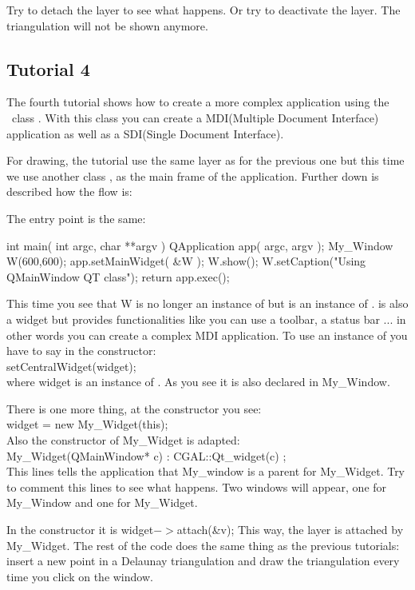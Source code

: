 Try to detach the layer to see what happens. Or try to deactivate
the layer. The triangulation will not be shown anymore.

\subsection*{Tutorial 4}

The fourth tutorial shows how to create a more complex application
using the \qt\ class . With this class you can create a
MDI(Multiple Document Interface) application as well as a SDI(Single Document Interface).

For drawing, the tutorial use the same layer as for the previous one
but this time we use another class , as the main frame of
the application. Further down is described how the flow is:

The entry point is the same:
\begin{ccExampleCode}
int main( int argc, char **argv )
{
    QApplication app( argc, argv );
    My_Window W(600,600);
    app.setMainWidget( &W );
    W.show();
    W.setCaption("Using QMainWindow QT class");
    return app.exec();
}
\end{ccExampleCode}
This time you see that W is no longer an instance of  but is
an instance of .  is also a widget but provides
functionalities like you can use a toolbar, a status bar ... in other
words you can create a complex MDI application. To use an instance of
 you have to say in the constructor:\\
setCentralWidget(widget);\\
where widget is an instance of . As you see it is also declared
in My\_Window.

There is one more thing, at the constructor you see:\\
widget = new My\_Widget(this);\\
Also the constructor of My\_Widget is adapted:\\
My\_Widget(QMainWindow* c) : CGAL::Qt\_widget(c) {};\\
This lines tells the application that My_window is a parent for
My\_Widget. Try to comment this lines to see what happens. Two
windows will appear, one for My\_Window and one for My\_Widget.

In the constructor it is widget$->$attach(\&v); This way, the layer is
attached by My\_Widget. The rest of the code does the same thing as the
previous tutorials: insert a new point in a Delaunay triangulation and
draw the triangulation every time you click on the window.

